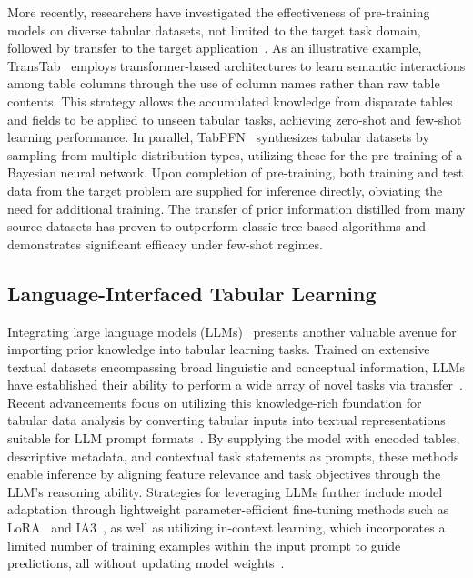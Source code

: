 More recently, researchers have investigated the effectiveness of pre-training models on diverse tabular datasets, not limited to the target task domain, followed by transfer to the target application~\cite{zhang2023generative,levin2022transfer,zhu2023xtab}. As an illustrative example, TransTab~\cite{wang2022transtab} employs transformer-based architectures to learn semantic interactions among table columns through the use of column names rather than raw table contents. This strategy allows the accumulated knowledge from disparate tables and fields to be applied to unseen tabular tasks, achieving zero-shot and few-shot learning performance. In parallel, TabPFN~\cite{hollmann2022tabpfn} synthesizes tabular datasets by sampling from multiple distribution types, utilizing these for the pre-training of a Bayesian neural network. Upon completion of pre-training, both training and test data from the target problem are supplied for inference directly, obviating the need for additional training. The transfer of prior information distilled from many source datasets has proven to outperform classic tree-based algorithms and demonstrates significant efficacy under few-shot regimes.

\subsection{Language-Interfaced Tabular Learning} Integrating large language models (LLMs)~\cite{anil2023palm,openai2023gpt4} presents another valuable avenue for importing prior knowledge into tabular learning tasks. Trained on extensive textual datasets encompassing broad linguistic and conceptual information, LLMs have established their ability to perform a wide array of novel tasks via transfer~\cite{brown2020language}. Recent advancements focus on utilizing this knowledge-rich foundation for tabular data analysis by converting tabular inputs into textual representations suitable for LLM prompt formats~\cite{dinh2022lift,hegselmann2023tabllm,wang2023anypredict}. By supplying the model with encoded tables, descriptive metadata, and contextual task statements as prompts, these methods enable inference by aligning feature relevance and task objectives through the LLM’s reasoning ability. Strategies for leveraging LLMs further include model adaptation through lightweight parameter-efficient fine-tuning methods such as LoRA~\cite{hu2021lora} and IA3~\cite{liu2022few}, as well as utilizing in-context learning, which incorporates a limited number of training examples within the input prompt to guide predictions, all without updating model weights~\cite{dinh2022lift,hegselmann2023tabllm,nam2023semi,slack2023tablet}.

